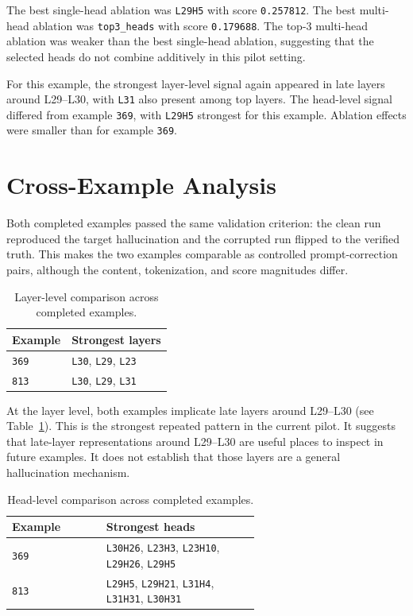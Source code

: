 \documentclass[11pt]{article}
\begin{document}
The best single-head ablation was \texttt{L29H5} with score \texttt{0.257812}. The best multi-head ablation was \texttt{top3\_heads} with score \texttt{0.179688}. The top-3 multi-head ablation was weaker than the best single-head ablation, suggesting that the selected heads do not combine additively in this pilot setting.

For this example, the strongest layer-level signal again appeared in late layers around L29--L30, with \texttt{L31} also present among top layers. The head-level signal differed from example \texttt{369}, with \texttt{L29H5} strongest for this example. Ablation effects were smaller than for example \texttt{369}.

\section{Cross-Example Analysis}

Both completed examples passed the same validation criterion: the clean run reproduced the target hallucination and the corrupted run flipped to the verified truth. This makes the two examples comparable as controlled prompt-correction pairs, although the content, tokenization, and score magnitudes differ.

\begin{table}[t]
\caption{Layer-level comparison across completed examples.}
\centering
\small
\begin{tabular}{ll}
\toprule
\textbf{Example} & \textbf{Strongest layers} \\
\midrule
\texttt{369} & \texttt{L30}, \texttt{L29}, \texttt{L23} \\
\texttt{813} & \texttt{L30}, \texttt{L29}, \texttt{L31} \\
\bottomrule
\end{tabular}

\label{tab:layer-comparison}
\end{table}

At the layer level, both examples implicate late layers around L29--L30 (see Table~\ref{tab:layer-comparison}). This is the strongest repeated pattern in the current pilot. It suggests that late-layer representations around L29--L30 are useful places to inspect in future examples. It does not establish that those layers are a general hallucination mechanism.



\begin{table}[t]
\caption{Head-level comparison across completed examples.}
\centering
\small
\begin{tabular}{lp{0.62\linewidth}}
\toprule
\textbf{Example} & \textbf{Strongest heads} \\
\midrule
\texttt{369} & \texttt{L30H26}, \texttt{L23H3}, \texttt{L23H10}, \texttt{L29H26}, \texttt{L29H5} \\
\texttt{813} & \texttt{L29H5}, \texttt{L29H21}, \texttt{L31H4}, \texttt{L31H31}, \texttt{L30H31} \\
\bottomrule
\end{tabular}

\label{tab:head-comparison}
\end{table}
\end{document}

